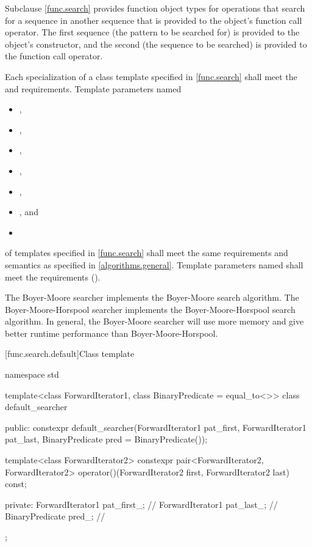 \pnum
Subclause \ref{func.search} provides function object types for
operations that search for a sequence  in another
sequence  that is provided to the object's function call
operator.  The first sequence (the pattern to be searched for) is provided to
the object's constructor, and the second (the sequence to be searched) is
provided to the function call operator.

\pnum
Each specialization of a class template specified in \ref{func.search}
shall meet the  and  requirements.
Template parameters named
\begin{itemize}
\item {},
\item {},
\item {},
\item {},
\item {},
\item {}, and
\item {}
\end{itemize}
of templates specified in
\ref{func.search} shall meet the same requirements and semantics as
specified in \ref{algorithms.general}.
Template parameters named  shall meet the 
requirements ().

\pnum
The Boyer-Moore searcher implements the Boyer-Moore search algorithm.
The Boyer-Moore-Horspool searcher implements the Boyer-Moore-Horspool search algorithm.
In general, the Boyer-Moore searcher will use more memory and give better runtime performance than Boyer-Moore-Horspool.

[func.search.default]{Class template }

%
\begin{codeblock}
namespace std {
  template<class ForwardIterator1, class BinaryPredicate = equal_to<>>
  class default_searcher {
  public:
    constexpr default_searcher(ForwardIterator1 pat_first, ForwardIterator1 pat_last,
                               BinaryPredicate pred = BinaryPredicate());

    template<class ForwardIterator2>
      constexpr pair<ForwardIterator2, ForwardIterator2>
        operator()(ForwardIterator2 first, ForwardIterator2 last) const;

  private:
    ForwardIterator1 pat_first_;        // \expos
    ForwardIterator1 pat_last_;         // \expos
    BinaryPredicate pred_;              // \expos
  };
}
\end{codeblock}

